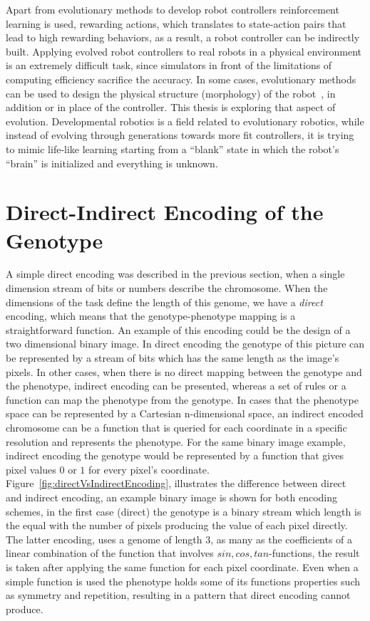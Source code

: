 Apart from evolutionary methods to develop robot controllers reinforcement learning is used, rewarding actions, which translates to state-action pairs that lead to high rewarding behaviors, as a result, a robot controller can be indirectly built. Applying evolved robot controllers to real robots in a physical environment is an extremely difficult task, since simulators in front of the limitations of computing efficiency sacrifice the accuracy. In some cases, evolutionary methods can be used to design the physical structure (morphology) of the robot~\cite{hiller2010evolving}, in addition or in place of the controller. This thesis is exploring that aspect of evolution. Developmental robotics is a field related to evolutionary robotics,  while instead of evolving through generations towards more fit controllers, it is trying to mimic life-like learning starting from a ``blank'' state in which the robot's ``brain'' is initialized and everything is unknown.


\section{Direct-Indirect Encoding of the Genotype}


A simple direct encoding was described in the previous section, when a single dimension stream of bits or numbers describe the chromosome. When the dimensions of the task define the length of this genome, we have a \emph{direct} encoding, which means that the genotype-phenotype mapping is a straightforward function. An example of this encoding could be the design of a two dimensional binary image. In direct encoding the genotype of this picture can be represented by a stream of bits which has the same length as the image's pixels. In other cases, when there is no direct mapping between the genotype and the phenotype, indirect encoding can be presented, whereas a set of rules or a function can map the phenotype from the genotype. In cases that the phenotype space can be represented by a Cartesian n-dimensional space, an indirect encoded chromosome can be a function that is queried for each coordinate in a specific resolution and represents the phenotype. For the same binary image example, indirect encoding the genotype would be represented by a function that gives pixel values $0$ or $1$ for every pixel's coordinate. Figure~\ref{fig:directVsIndirectEncoding}, illustrates the difference between direct and indirect encoding, an example binary image is shown for both encoding schemes, in the first case (direct) the genotype is a binary stream which length is the equal with the number of pixels producing the value of each pixel directly. The latter encoding, uses a genome of length 3, as many as the coefficients of a linear combination of the function that involves $sin, cos, tan$-functions, the result is taken after applying the same function for each pixel coordinate. Even when a simple function is used the  phenotype holds some of its functions properties such as symmetry and repetition, resulting in a pattern that direct encoding cannot produce.



